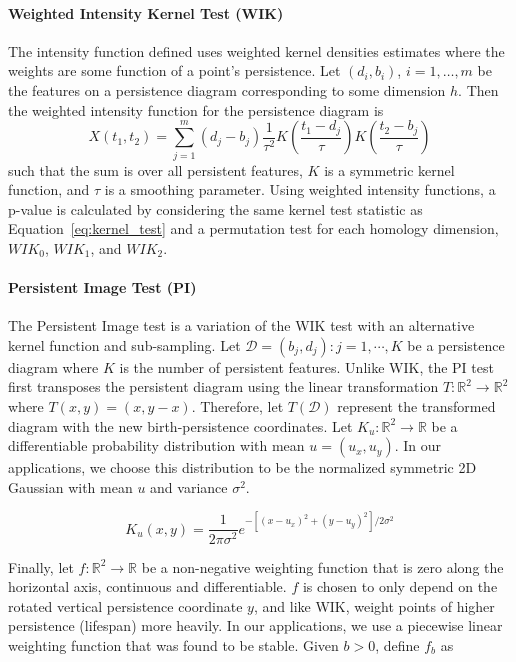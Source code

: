 \documentclass[12pt]{article}
\begin{document}

\paragraph{Weighted Intensity Kernel Test (WIK)}
The intensity function defined \citep{chen2015statistical} uses weighted kernel densities estimates where the weights are some function of a point's persistence.   
Let $(d_i, b_i)$, $i = 1, \ldots, m$ be the features on a persistence diagram corresponding to some dimension $h$.  Then the weighted intensity function for the persistence diagram is 
%
\[ X(t_1, t_2) = \sum_{j=1}^m(d_{j} - b_{j})\frac{1}{\tau^{2}}K \left(\frac{t_1-d_{j}}{\tau}\right)K \left(\frac{t_2-b_{j}}{\tau}\right)\]
%
such that the sum is over all persistent features, $K$ is a symmetric kernel function, and $\tau$ is a smoothing parameter. 
Using weighted intensity functions, a p-value is calculated by considering the same kernel test statistic as Equation~\eqref{eq:kernel_test} and a permutation test for each homology dimension, $WIK_0$, $WIK_1$, and $WIK_2$.

\paragraph{Persistent Image Test (PI)} The Persistent Image test \citep{adams2015persistent} is a variation of the WIK test with an alternative kernel function and sub-sampling. Let $\mathcal{D} = {(b_{j} , d_{j}) : j = 1, \cdots ,K}$ be a persistence diagram where $K$ is the number of persistent features. Unlike WIK, the PI test first transposes the persistent diagram using the linear transformation $T: \mathbb{R}^{2} \rightarrow \mathbb{R}^{2}$ where $T(x,y) = (x, y-x)$. Therefore, let $T(\mathcal{D})$ represent the transformed diagram with the new birth-persistence coordinates. Let $K_{u} : \mathbb{R}^{2} \rightarrow \mathbb{R}$ be a differentiable probability distribution with mean $u = (u_{x}, u_{y})$. In our applications, we choose this distribution to be the normalized symmetric 2D Gaussian with mean $u$ and variance $\sigma^{2}$. 

\[ K_{u}(x,y) = \frac{1}{2\pi\sigma^{2}}e^{-[(x - u_{x})^{2} + (y-u_{y})^{2}]/2\sigma^{2}} \]

Finally, let $f : \mathbb{R}^{2} \rightarrow \mathbb{R}$ be a non-negative weighting function that is zero along the horizontal axis, continuous and differentiable. $f$ is chosen to only depend on the rotated vertical persistence coordinate $y$, and like WIK, weight points of higher persistence (lifespan) more heavily. In our applications, we use a piecewise linear weighting function that was found to be stable. Given $b > 0$, define $f_{b}$ as
\end{document}
